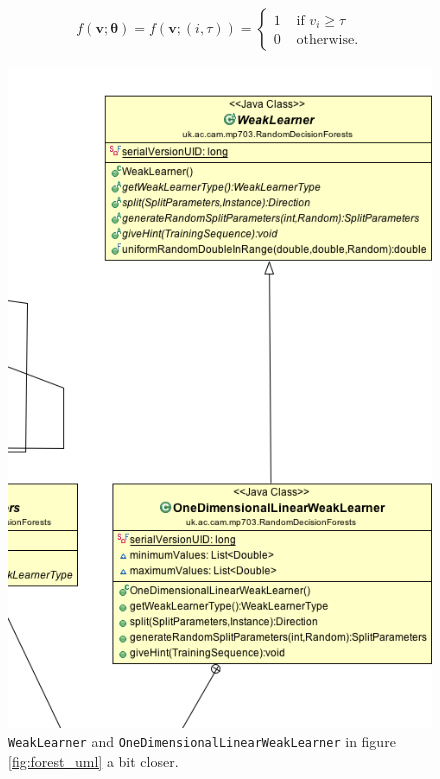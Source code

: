 \documentclass[12pt,twoside,notitlepage]{report}
\newcommand{\vc}[1]{\mathbf{#1}}
\begin{document}
                \begin{align}
                  f(\vc{v}; \vc{\theta}) = f(\vc{v}; (i,\tau)) = \begin{cases}
                    1 & \text{ if } v_i \geq \tau \\
                    0 & \text{ otherwise.}
                  \end{cases}
                  \label{eq:split_equation}
                \end{align}

                \begin{figure}[H]
                    \centering
                    \includegraphics[scale=0.5]{WeakLearner_Forest_UML}
                    \caption{\texttt{WeakLearner} and \texttt{OneDimensionalLinearWeakLearner} in figure \ref{fig:forest_uml} a bit closer.}
                    \label{fig:weak_learner_uml}
                \end{figure}
\end{document}
